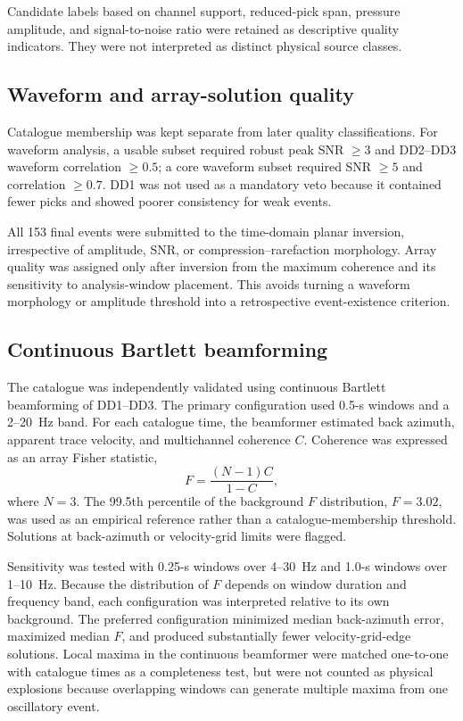 \documentclass[]{seismica}
\begin{document}
Candidate labels based on channel support, reduced-pick span, pressure amplitude, and signal-to-noise ratio were retained as descriptive quality indicators. They were not interpreted as distinct physical source classes.

\subsection{Waveform and array-solution quality}

Catalogue membership was kept separate from later quality classifications.
For waveform analysis, a usable subset required robust peak SNR $\geq3$ and
DD2--DD3 waveform correlation $\geq0.5$; a core waveform subset required SNR
$\geq5$ and correlation $\geq0.7$. DD1 was not used as a mandatory veto
because it contained fewer picks and showed poorer consistency for weak
events.

All 153 final events were submitted to the time-domain planar inversion,
irrespective of amplitude, SNR, or compression--rarefaction morphology. Array
quality was assigned only after inversion from the maximum coherence and its
sensitivity to analysis-window placement. This avoids turning a waveform
morphology or amplitude threshold into a retrospective event-existence
criterion.

\subsection{Continuous Bartlett beamforming}

The catalogue was independently validated using continuous Bartlett
beamforming of DD1--DD3. The primary configuration used 0.5-s windows and a
2--20~Hz band. For each catalogue time, the beamformer estimated back azimuth,
apparent trace velocity, and multichannel coherence $C$. Coherence was
expressed as an array Fisher statistic,
\begin{equation}
  F=\frac{(N-1)C}{1-C},
  \label{eq:f_statistic}
\end{equation}
where $N=3$. The 99.5th percentile of the background $F$ distribution,
$F=3.02$, was used as an empirical reference rather than a catalogue-membership
threshold. Solutions at back-azimuth or velocity-grid limits were flagged.

Sensitivity was tested with 0.25-s windows over 4--30~Hz and 1.0-s windows
over 1--10~Hz. Because the distribution of $F$ depends on window duration and
frequency band, each configuration was interpreted relative to its own
background. The preferred configuration minimized median back-azimuth error,
maximized median $F$, and produced substantially fewer velocity-grid-edge
solutions. Local maxima in the continuous beamformer were matched one-to-one
with catalogue times as a completeness test, but were not counted as physical
explosions because overlapping windows can generate multiple maxima from one
oscillatory event.
\end{document}
